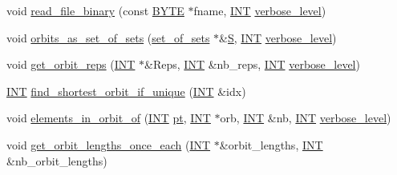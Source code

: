 \begin{DoxyCompactItemize}
\item 
void \mbox{\hyperlink{classschreier_abd32d044d2691866632d246bd5b9c3d4}{read\+\_\+file\+\_\+binary}} (const \mbox{\hyperlink{galois_8h_ab6cc7b4aeb6ea31aba2b3fbfc83ff5e6}{B\+Y\+TE}} $\ast$fname, \mbox{\hyperlink{galois_8h_a09fddde158a3a20bd2dcadb609de11dc}{I\+NT}} \mbox{\hyperlink{simeon_8_c_a818073fbcc2f439e7c56952f67386122}{verbose\+\_\+level}})
\item 
void \mbox{\hyperlink{classschreier_ad8db2ddbc6f202bab0440e22f59bd6d5}{orbits\+\_\+as\+\_\+set\+\_\+of\+\_\+sets}} (\mbox{\hyperlink{classset__of__sets}{set\+\_\+of\+\_\+sets}} $\ast$\&\mbox{\hyperlink{simeon_8_c_adab47f8243f1b5a2c31df2535d6b37d0}{S}}, \mbox{\hyperlink{galois_8h_a09fddde158a3a20bd2dcadb609de11dc}{I\+NT}} \mbox{\hyperlink{simeon_8_c_a818073fbcc2f439e7c56952f67386122}{verbose\+\_\+level}})
\item 
void \mbox{\hyperlink{classschreier_a4436afe460eedb9b88dda0f4f6613479}{get\+\_\+orbit\+\_\+reps}} (\mbox{\hyperlink{galois_8h_a09fddde158a3a20bd2dcadb609de11dc}{I\+NT}} $\ast$\&Reps, \mbox{\hyperlink{galois_8h_a09fddde158a3a20bd2dcadb609de11dc}{I\+NT}} \&nb\+\_\+reps, \mbox{\hyperlink{galois_8h_a09fddde158a3a20bd2dcadb609de11dc}{I\+NT}} \mbox{\hyperlink{simeon_8_c_a818073fbcc2f439e7c56952f67386122}{verbose\+\_\+level}})
\item 
\mbox{\hyperlink{galois_8h_a09fddde158a3a20bd2dcadb609de11dc}{I\+NT}} \mbox{\hyperlink{classschreier_a91978aa7871c57d3e1d7b185b9cd688b}{find\+\_\+shortest\+\_\+orbit\+\_\+if\+\_\+unique}} (\mbox{\hyperlink{galois_8h_a09fddde158a3a20bd2dcadb609de11dc}{I\+NT}} \&idx)
\item 
void \mbox{\hyperlink{classschreier_a50c0574448d65644e0d408b718662132}{elements\+\_\+in\+\_\+orbit\+\_\+of}} (\mbox{\hyperlink{galois_8h_a09fddde158a3a20bd2dcadb609de11dc}{I\+NT}} \mbox{\hyperlink{clique__finder_8_c_aec1f1a2b30fdca8844c2932384483145}{pt}}, \mbox{\hyperlink{galois_8h_a09fddde158a3a20bd2dcadb609de11dc}{I\+NT}} $\ast$orb, \mbox{\hyperlink{galois_8h_a09fddde158a3a20bd2dcadb609de11dc}{I\+NT}} \&nb, \mbox{\hyperlink{galois_8h_a09fddde158a3a20bd2dcadb609de11dc}{I\+NT}} \mbox{\hyperlink{simeon_8_c_a818073fbcc2f439e7c56952f67386122}{verbose\+\_\+level}})
\item 
void \mbox{\hyperlink{classschreier_a9f86e98688bf04c7210ccba5ffe23bd7}{get\+\_\+orbit\+\_\+lengths\+\_\+once\+\_\+each}} (\mbox{\hyperlink{galois_8h_a09fddde158a3a20bd2dcadb609de11dc}{I\+NT}} $\ast$\&orbit\+\_\+lengths, \mbox{\hyperlink{galois_8h_a09fddde158a3a20bd2dcadb609de11dc}{I\+NT}} \&nb\+\_\+orbit\+\_\+lengths)

\end{DoxyCompactItemize}
